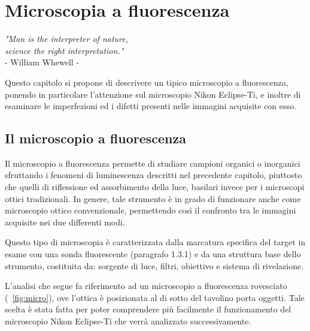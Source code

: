 \clearpage{\pagestyle{empty}\cleardoublepage}

\chapter{Microscopia a fluorescenza}

\begin{flushright}\begin{small}\textit{"Man is the interpreter of nature,\\ 
science the right interpretation."}\\
- William Whewell -\\
\end{small}\end{flushright}

Questo capitolo si propone di descrivere un tipico microscopio a fluorescenza, ponendo in particolare l'attenzione sul microscopio Nikon Eclipse-Ti, e inoltre di esaminare le imperfezioni ed i difetti presenti nelle immagini acquisite con esso.

\section {Il microscopio a fluorescenza}

Il microscopio a fluorescenza permette di studiare campioni organici o inorganici sfruttando i fenomeni di luminescenza descritti nel precedente capitolo, piuttosto che quelli di riflessione ed assorbimento della luce, basilari invece per i microscopi ottici tradizionali. In genere, tale strumento è in grado di funzionare anche come microscopio ottico convenzionale, permettendo così il confronto tra le immagini acquisite nei due differenti modi.

Questo tipo di microscopia è caratterizzata dalla marcatura specifica del target in esame con una sonda fluorescente (paragrafo 1.3.1) e da una struttura base dello strumento, costituita da: sorgente di luce, filtri, obiettivo e sistema di rivelazione. 

L'analisi che segue fa riferimento ad un microscopio a fluorescenza rovesciato (\figurename~\ref{fig:micro}), ove l'ottica è posizionata al di sotto del tavolino porta oggetti. Tale scelta è stata fatta per poter comprendere più facilmente il funzionamento del microscopio Nikon Eclipse-Ti che verrà analizzato successivamente.

